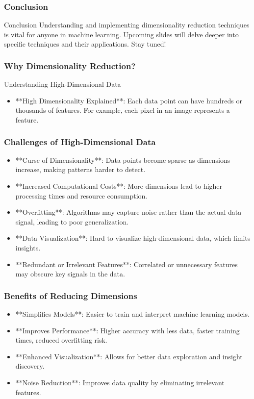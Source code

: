 \documentclass[aspectratio=169]{beamer}
\begin{document}
\begin{frame}[fragile]
    \frametitle{Conclusion}
    \begin{block}{Conclusion}
        Understanding and implementing dimensionality reduction techniques is vital for anyone in machine learning. 
        Upcoming slides will delve deeper into specific techniques and their applications. Stay tuned!
    \end{block}
\end{frame}

\begin{frame}[fragile]
    \frametitle{Why Dimensionality Reduction?}
    \begin{block}{Understanding High-Dimensional Data}
        \begin{itemize}
            \item **High Dimensionality Explained**: 
            Each data point can have hundreds or thousands of features. For example, each pixel in an image represents a feature.
        \end{itemize}
    \end{block}
\end{frame}

\begin{frame}[fragile]
    \frametitle{Challenges of High-Dimensional Data}
    \begin{itemize}
        \item **Curse of Dimensionality**: Data points become sparse as dimensions increase, making patterns harder to detect.
        \item **Increased Computational Costs**: More dimensions lead to higher processing times and resource consumption.
        \item **Overfitting**: Algorithms may capture noise rather than the actual data signal, leading to poor generalization.
        \item **Data Visualization**: Hard to visualize high-dimensional data, which limits insights.
        \item **Redundant or Irrelevant Features**: Correlated or unnecessary features may obscure key signals in the data.
    \end{itemize}
\end{frame}

\begin{frame}[fragile]
    \frametitle{Benefits of Reducing Dimensions}
    \begin{itemize}
        \item **Simplifies Models**: Easier to train and interpret machine learning models.
        \item **Improves Performance**: Higher accuracy with less data, faster training times, reduced overfitting risk.
        \item **Enhanced Visualization**: Allows for better data exploration and insight discovery.
        \item **Noise Reduction**: Improves data quality by eliminating irrelevant features.
    \end{itemize}
\end{frame}
\end{document}
